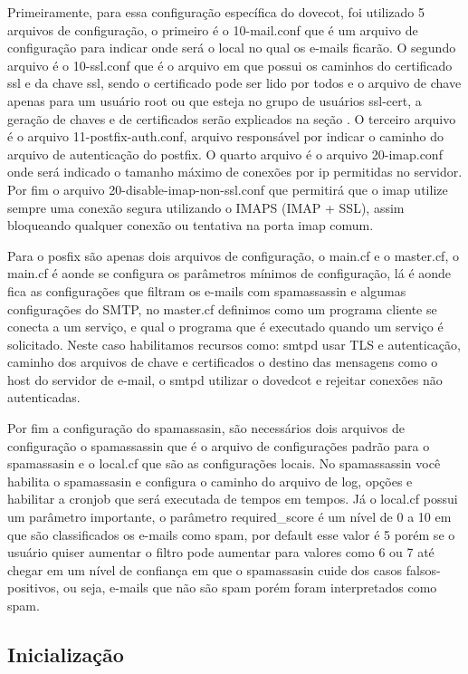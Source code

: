 Primeiramente, para essa configuração específica do dovecot, foi utilizado 5 arquivos
de configuração, o primeiro é o 10-mail.conf que é um arquivo de configuração para
indicar onde será o local no qual os e-mails ficarão. O segundo arquivo é o 10-ssl.conf
que é o arquivo em que possui os caminhos do certificado ssl e da chave ssl, sendo o
certificado pode ser lido por todos e o arquivo de chave apenas para um usuário root
ou que esteja no grupo de usuários ssl-cert, a geração de chaves e de certificados serão
explicados na seção %
. O terceiro arquivo é o arquivo
11-postfix-auth.conf, arquivo responsável por indicar o caminho do arquivo de autenticação
do postfix. O quarto arquivo é o arquivo 20-imap.conf onde será indicado o tamanho
máximo de conexões por ip permitidas no servidor. Por fim o arquivo
20-disable-imap-non-ssl.conf que permitirá que o imap utilize sempre uma conexão
segura utilizando o IMAPS (IMAP + SSL), assim bloqueando qualquer conexão ou
tentativa na porta imap comum.

Para o posfix são apenas dois arquivos de configuração, o main.cf e o master.cf,
o main.cf é aonde se configura os parâmetros mínimos de configuração, lá é aonde fica as configurações que filtram os e-mails com spamassassin e algumas configurações do SMTP, no
master.cf definimos como um programa cliente se conecta a um serviço, e qual o
programa que é executado quando um serviço é solicitado. Neste caso habilitamos
recursos como: smtpd usar TLS e autenticação, caminho dos arquivos de chave e certificados
o destino das mensagens como o host do servidor de e-mail, o smtpd utilizar o dovedcot
e rejeitar conexões não autenticadas.

Por fim a configuração do spamassasin, são necessários dois arquivos de configuração
o spamassassin que é o arquivo de configurações padrão para o spamassasin e o
local.cf que são as configurações locais. No spamassassin você habilita o spamassasin
e configura o caminho do arquivo de log, opções e habilitar a cronjob que será
executada de tempos em tempos. Já o local.cf possui um parâmetro importante, o
parâmetro required\_score é um nível de 0 a 10 em que são classificados os e-mails
como spam, por default esse valor é 5 porém se o usuário quiser aumentar o filtro
pode aumentar para valores como 6 ou 7 até chegar em um nível de confiança em que
o spamassasin cuide dos casos falsos-positivos, ou seja, e-mails que não são spam
porém foram interpretados como spam.

\subsection{Inicialização}


